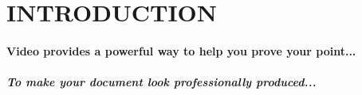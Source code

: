 \documentclass{article}
\begin{document}
\section{INTRODUCTION}
\paragraph{Video provides a powerful way to help you prove your point...}
\subparagraph{To make your document look professionally produced...}
\end{document}

